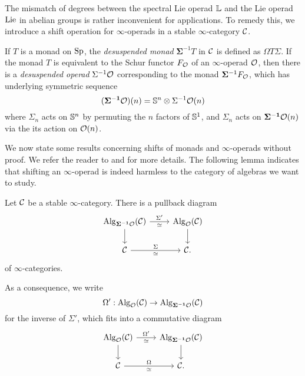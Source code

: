 The mismatch of degrees between the spectral Lie operad ${\mathbb{L}}$ and the Lie operad $\operatorname{Lie}$ in abelian groups is rather inconvenient for applications. To remedy this, we introduce a shift operation for $\infty$-operads in a stable $\infty$-category ${\mathcal{C}}$. 
\begin{definition}
\cite[Section 3]{Camarena_mod2_free_spectral_Lie_algebra} 
    If $T$ is a monad on $\operatorname{Sp}$, the \emph{desuspended monad} $\mathbf{\Sigma}^{-1}  T$ in ${\mathcal{C}}$ is defined as 
	$
	\Omega T\Sigma.
	$
	If the monad $T$ is equivalent to the Schur functor $F_{{\mathcal{O}}}$ of an $\infty$-operad ${\mathcal{O}}$, then there is a \emph{desuspended operad} $\Sigma^{-1}{\mathcal{O}}$ corresponding to the monad $\mathbf{\Sigma}^{-1} F_{{\mathcal{O}}}$, which has underlying symmetric sequence 
	$$
	(\mathbf{\Sigma^{-1}} {\mathcal{O}} ) (n)= {\mathbb{S}}^{n}\otimes\Sigma^{-1} {\mathcal{O}}(n)
	$$
	where $\Sigma_n$ acts on ${\mathbb{S}}^{n}$ by permuting the $n$ factors of ${\mathbb{S}}^{1}$, and $\Sigma_n$ acts on $\mathbf{\Sigma^{-1}} {\mathcal{O}}(n)$ via the its action on ${\mathcal{O}}(n)$.
\end{definition}

We now state some results concerning shifts of monads and $\infty$-operads without proof. We refer the reader to \cite[Section 2.2.4.]{Hadrianphdthesis} and \cite{Camarena_mod2_free_spectral_Lie_algebra} for more details.
The following lemma indicates that shifting an $\infty$-operad is indeed harmless to the category of algebras we want to study.
\begin{lemma}
\cite[Section 2.2.4.]{Hadrianphdthesis}
\label{Shift has no harm}
Let ${\mathcal{C}}$ be a stable $\infty$-category.
There is a pullback diagram
\[
    \begin{tikzcd}
	\Alg_{\bf{\Sigma}^{-1} \CO }(\CC)    & \Alg_{\CO}(\CC) \\
	 \CC & \CC
	\arrow[from=1-1, to = 1-2, "\Sigma'", "\simeq" below]
	\arrow[from=1-1 , to =2-1,  left]
	\arrow[from=1-2 , to =2-2,  right]
	\arrow[from=2-1, to=2-2, "\Sigma", "\simeq" below].
\end{tikzcd}
\]
of $\infty$-categories.
\end{lemma}
As a consequence, we write  
$$
\Omega':
\operatorname{Alg}_{{\mathcal{O}}}({\mathcal{C}}) \to \operatorname{Alg}_{\bf{\Sigma}^{-1} {\mathcal{O}} }({\mathcal{C}})
$$
for the inverse of $\Sigma'$,
which fits into a commutative diagram
\[
    \begin{tikzcd}
	\Alg_{\CO}(\CC)    & \Alg_{\bf{\Sigma}^{-1} \CO }(\CC) \\
	 \CC & \CC
	\arrow[from=1-1, to = 1-2, "\Omega'", "\simeq" below]
	\arrow[from=1-1 , to =2-1,  left]
	\arrow[from=1-2 , to =2-2,  right]
	\arrow[from=2-1, to=2-2, "\Omega", "\simeq" below].
\end{tikzcd}
\]

